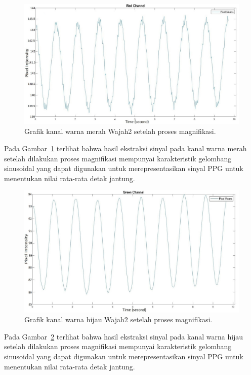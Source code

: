 \begin{figure}[ht]
	\vspace{0.5em}
	\centering
	\includegraphics[width=\textwidth,height=0.25\textheight]{Red_channel_wajah2-result}
	\caption{Grafik kanal warna merah Wajah2 setelah proses magnifikasi.}
	\label{fig:grafik-red-wajah2-result}   
\end{figure}
Pada Gambar~\ref{fig:grafik-red-wajah2-result} terlihat bahwa hasil ekstraksi sinyal pada kanal warna merah setelah dilakukan proses magnifikasi mempunyai karakteristik gelombang sinusoidal yang dapat digunakan untuk merepresentasikan sinyal PPG untuk menentukan nilai rata-rata detak jantung.
\newpage
\begin{figure}[ht]
	\vspace{0.5em}
	\centering
	\includegraphics[width=\textwidth,height=0.25\textheight]{Green_channel_wajah2-result}
	\caption{Grafik kanal warna hijau Wajah2 setelah proses magnifikasi.}
	\label{fig:grafik-green-wajah2-result}   
\end{figure}
Pada Gambar~\ref{fig:grafik-green-wajah2-result} terlihat bahwa hasil ekstraksi sinyal pada kanal warna hijau setelah dilakukan proses magnifikasi mempunyai karakteristik gelombang sinusoidal yang dapat digunakan untuk merepresentasikan sinyal PPG untuk menentukan nilai rata-rata detak jantung.

